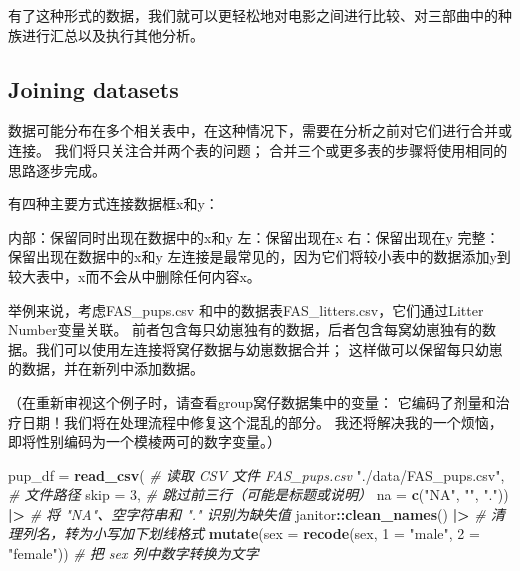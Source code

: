 \documentclass[
]{article}
\newenvironment{Shaded}{\begin{snugshade}}{\end{snugshade}}
\newcommand{\AttributeTok}[1]{\textcolor[rgb]{0.13,0.29,0.53}{#1}}
\newcommand{\CommentTok}[1]{\textcolor[rgb]{0.56,0.35,0.01}{\textit{#1}}}
\newcommand{\DecValTok}[1]{\textcolor[rgb]{0.00,0.00,0.81}{#1}}
\newcommand{\FunctionTok}[1]{\textcolor[rgb]{0.13,0.29,0.53}{\textbf{#1}}}
\newcommand{\NormalTok}[1]{#1}
\newcommand{\OtherTok}[1]{\textcolor[rgb]{0.56,0.35,0.01}{#1}}
\newcommand{\SpecialCharTok}[1]{\textcolor[rgb]{0.81,0.36,0.00}{\textbf{#1}}}
\newcommand{\StringTok}[1]{\textcolor[rgb]{0.31,0.60,0.02}{#1}}
\begin{document}
有了这种形式的数据，我们就可以更轻松地对电影之间进行比较、对三部曲中的种族进行汇总以及执行其他分析。

\subsection{Joining datasets}\label{joining-datasets}

数据可能分布在多个相关表中，在这种情况下，需要在分析之前对它们进行合并或连接。
我们将只关注合并两个表的问题；
合并三个或更多表的步骤将使用相同的思路逐步完成。

有四种主要方式连接数据框x和y：

内部：保留同时出现在数据中的x和y 左：保留出现在x 右：保留出现在y
完整：保留出现在数据中的x和y
左连接是最常见的，因为它们将较小表中的数据添加y到较大表中，x而不会从中删除任何内容x。

举例来说，考虑FAS\_pups.csv 和中的数据表FAS\_litters.csv，它们通过Litter
Number变量关联。
前者包含每只幼崽独有的数据，后者包含每窝幼崽独有的数据。我们可以使用左连接将窝仔数据与幼崽数据合并；
这样做可以保留每只幼崽的数据，并在新列中添加数据。

（在重新审视这个例子时，请查看group窝仔数据集中的变量：
它编码了剂量和治疗日期！我们将在处理流程中修复这个混乱的部分。
我还将解决我的一个烦恼，即将性别编码为一个模棱两可的数字变量。）

\begin{Shaded}
\begin{Highlighting}[]
\NormalTok{pup\_df }\OtherTok{=} 
  \FunctionTok{read\_csv}\NormalTok{(                                                          }\CommentTok{\# 读取 CSV 文件 FAS\_pups.csv}
    \StringTok{"./data/FAS\_pups.csv"}\NormalTok{,                                           }\CommentTok{\# 文件路径}
    \AttributeTok{skip =} \DecValTok{3}\NormalTok{,                                                        }\CommentTok{\# 跳过前三行（可能是标题或说明）}
    \AttributeTok{na =} \FunctionTok{c}\NormalTok{(}\StringTok{"NA"}\NormalTok{, }\StringTok{""}\NormalTok{, }\StringTok{"."}\NormalTok{)) }\SpecialCharTok{|\textgreater{}}                                        \CommentTok{\# 将 "NA"、空字符串和 "." 识别为缺失值}
\NormalTok{  janitor}\SpecialCharTok{::}\FunctionTok{clean\_names}\NormalTok{() }\SpecialCharTok{|\textgreater{}}                                          \CommentTok{\# 清理列名，转为小写加下划线格式}
  \FunctionTok{mutate}\NormalTok{(}\AttributeTok{sex =} \FunctionTok{recode}\NormalTok{(sex, }\StringTok{\textasciigrave{}}\AttributeTok{1}\StringTok{\textasciigrave{}} \OtherTok{=} \StringTok{"male"}\NormalTok{, }\StringTok{\textasciigrave{}}\AttributeTok{2}\StringTok{\textasciigrave{}} \OtherTok{=} \StringTok{"female"}\NormalTok{))            }\CommentTok{\# 把 sex 列中数字转换为文字 }
\end{Highlighting}
\end{Shaded}
\end{document}
